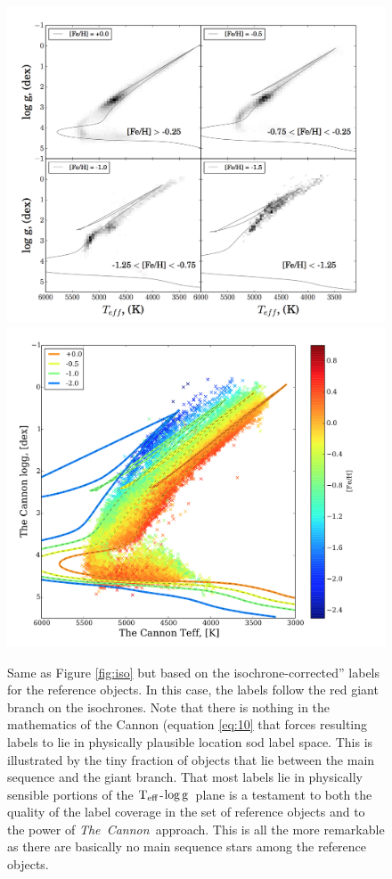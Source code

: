 \documentclass[12pt, preprint]{aastex}
\newcommand{\teff}{\mbox{$\rm T_{eff}$}}
\newcommand{\logg}{\mbox{$\rm \log g$}}
\newcommand{\tc}{\textsl{The~Cannon}}
\begin{document}
\begin{figure}[!h]
\centering

      \includegraphics[scale=0.25]{./plots/iso2.png}
  \hspace{-20pt}
    \includegraphics[scale=0.25]{./plots/iso2a.png}
\caption{Same as Figure \ref{fig:iso} but based on the isochrone-corrected'' labels for the reference objects. In this case, the labels follow the red giant branch on the isochrones. Note that there is nothing in the mathematics of the Cannon (equation \ref{eq:10} that forces resulting labels to lie in physically plausible location sod label space. This is illustrated by the tiny fraction of objects that lie between the main sequence and the giant branch. That most labels lie in physically sensible portions of the \teff-\logg\ plane is a testament to both the quality of the label coverage in the set of reference objects and to the power of \tc\ approach. This is all the more remarkable as there are basically no main sequence stars among the reference objects.}
\label{fig:iso2}
\end{figure}
\end{document}
